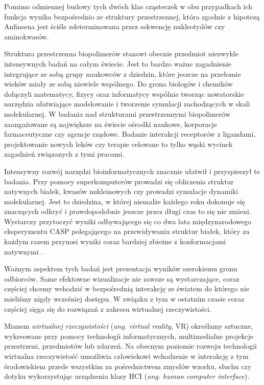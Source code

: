 \documentclass[licencjacka]{pracamgr}
\begin{document}
Pomimo odmiennej budowy tych dwóch klas cząsteczek w obu przypadkach ich funkcja wynika bezpośrednio ze struktury przestrzennej, która zgodnie z hipotezą Anfinsena \cite{anfinsen73} jest ściśle zdeterminowana przez sekwencję nukleotydów czy aminokwasów.

Struktura przestrzenna biopolimerów stanowi obecnie przedmiot niezwykle intensywnych badań na całym świecie. Jest to bardzo ważne zagadnienie integrujące ze sobą grupy naukowców z dziedzin, które jeszcze na przełomie wieków miały ze sobą niewiele wspólnego. Do grona biologów i chemików dołączyli matematycy, fizycy oraz informatycy wspólnie tworząc nowatorskie narzędzia ułatwiające modelowanie i tworzenie symulacji zachodzących w skali molekularnej. W badania nad strukturami przestrzennymi biopolimerów zaangażowane są największe na świecie ośrodki naukowe, korporacje farmaceutyczne czy agencje rządowe. Badanie interakcji receptorów z ligandami, projektowanie nowych leków czy terapie celowane to tylko wąski wycinek zagadnień związanych z tymi pracami.

Intensywny rozwój narzędzi bioinformatycznych znacznie ułatwił i przyspieszył te badania. Przy pomocy superkomputerów prowadzi się obliczenia struktur natywnych białek, kwasów nukleinowych czy prowadzi symulacje dynamiki molekularnej. Jest to dziedzina, w której niemalże każdego roku dokonuje się znaczących odkryć i prawdopodobnie jeszcze przez długi czas to się nie zmieni. Wystarczy przytoczyć wyniki odbywającego się co dwa lata międzynarodowego eksperymentu CASP polegającego na przewidywaniu struktur białek, który za każdym razem przynosi wyniki coraz bardziej zbieżne z konformacjami natywnymi \cite{casp}.

Ważnym aspektem tych badań jest prezentacja wyników szerokiemu gronu odbiorców. Same efektowne wizualizacje nie zawsze są wystarczające, coraz częściej chcemy wchodzić w bezpośrednią interakcję ze światem do którego nie mieliśmy nigdy wcześniej dostępu. W związku z tym w ostatnim czasie coraz częściej sięga się do rozwiązań z zakresu wirtualnej rzeczywistości. 

Mianem \textit{wirtualnej rzeczywistości} (\textit{ang. virtual reality}, VR) określamy sztuczne, wykreowane przy pomocy technologii informatycznych, multimedialne projekcje przestrzeni, przedmiotów lub zdarzeń. Na obecnym poziomie rozwoju technologii wirtualna rzeczywistość umożliwia człowiekowi wchodzenie w interakcję z tym środowiskiem przede wszystkim za pośrednictwem zmysłów wzorku, słuchu czy dotyku wykorzystując urządzenia klasy HCI (\textit{ang. human computer interface}). 
\end{document}
